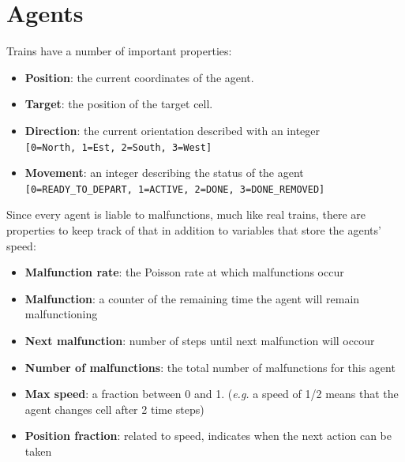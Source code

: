 \section{Agents}
Trains have a number of important properties:
\begin{itemize}
\item \textbf{Position}: the current coordinates of the agent.
\item \textbf{Target}: the position of the target cell.
\item \textbf{Direction}: the current orientation described with an integer\\
    \verb|[0=North, 1=Est, 2=South, 3=West]|
\item \textbf{Movement}: an integer describing the status of the agent\\
    \verb|[0=READY_TO_DEPART, 1=ACTIVE, 2=DONE, 3=DONE_REMOVED]|
\end{itemize}
\noindent
Since every agent is liable to malfunctions, much like real trains, there are properties to keep track of that in addition to variables that store the agents' speed:
\begin{itemize}
\item 	\textbf{Malfunction rate}: the Poisson rate at which malfunctions occur
\item \textbf{Malfunction}: a counter of the remaining time the agent will remain malfunctioning
\item \textbf{Next malfunction}: number of steps until next malfunction will occour
\item \textbf{Number of malfunctions}: the total number of malfunctions for this agent
\item \textbf{Max speed}: a fraction between 0 and 1. (\textit{e.g.} a speed of 1/2 means that the agent changes cell after 2 time steps)
\item \textbf{Position fraction}: related to speed, indicates when the next action can be taken
\end{itemize}
